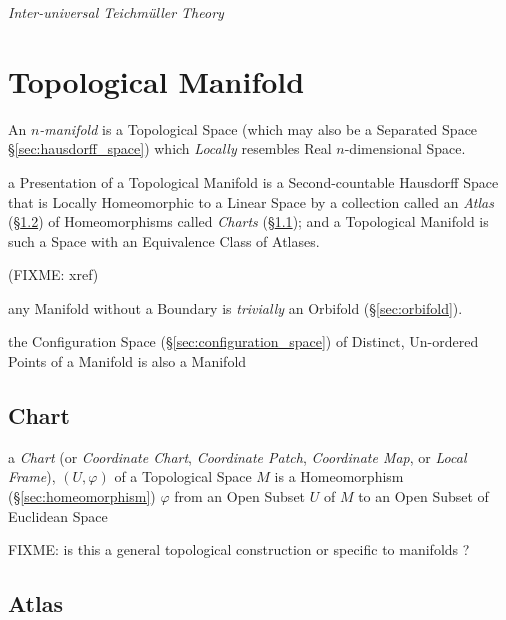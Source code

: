 \emph{Inter-universal Teichm\"uller Theory} %



\section{Topological Manifold}\label{sec:topological_manifold}

An \emph{$n$-manifold} is a Topological Space (which may also be a Separated
Space \S\ref{sec:hausdorff_space}) which \emph{Locally} resembles Real
$n$-dimensional Space.

a Presentation of a Topological Manifold is a Second-countable Hausdorff Space
that is Locally Homeomorphic to a Linear Space by a collection called an
\emph{Atlas} (\S\ref{sec:atlas}) of Homeomorphisms called \emph{Charts}
(\S\ref{sec:chart}); and a Topological Manifold is such a Space with an
Equivalence Class of Atlases.

(FIXME: xref)

\fist any Manifold without a Boundary is \emph{trivially} an Orbifold
(\S\ref{sec:orbifold}).

the Configuration Space (\S\ref{sec:configuration_space}) of Distinct,
Un-ordered Points of a Manifold is also a Manifold



\subsection{Chart}\label{sec:chart}

a \emph{Chart} (or \emph{Coordinate Chart}, \emph{Coordinate Patch},
\emph{Coordinate Map}, or \emph{Local Frame}), $(U, \varphi)$ of a Topological
Space $M$ is a Homeomorphism (\S\ref{sec:homeomorphism}) $\varphi$ from an Open
Subset $U$ of $M$ to an Open Subset of Euclidean Space

FIXME: is this a general topological construction or specific to manifolds ?



\subsection{Atlas}\label{sec:atlas}

